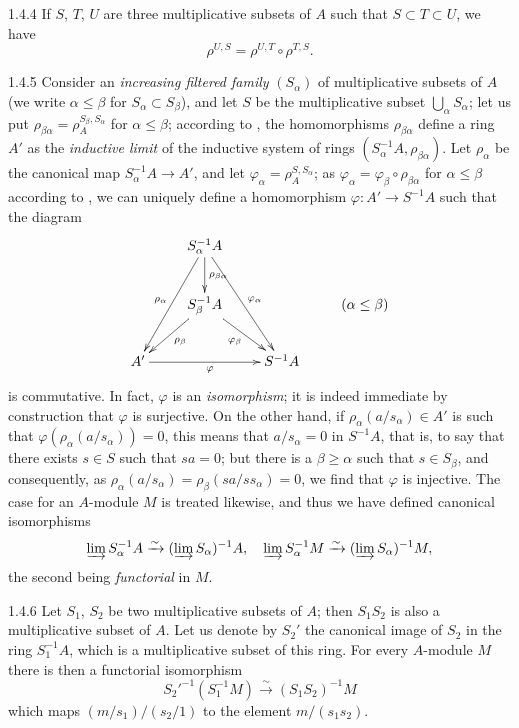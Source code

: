 \documentclass{book}
\begin{document}
\begin{env}{1.4.4}
\label{env-0.1.4.4}
If $S$, $T$, $U$ are three multiplicative subsets of $A$ such that $S\subset T\subset U$, we have
\[
  \rho^{U,S}=\rho^{U,T}\circ\rho^{T,S}.
\]
\end{env}

\begin{env}{1.4.5}
\label{env-0.1.4.5}
Consider an \emph{increasing filtered family} $(S_\alpha)$ of multiplicative subsets of $A$
(we write $\alpha\leq\beta$ for $S_\alpha\subset S_\beta$), and let $S$ be the multiplicative subset
$\bigcup_\alpha S_\alpha$; let us put $\rho_{\beta\alpha}=\rho_A^{S_\beta,S_\alpha}$ for $\alpha\leq\beta$;
according to , the homomorphisms $\rho_{\beta\alpha}$ define a ring $A'$ as the \emph{inductive limit}
of the inductive system of rings $(S_\alpha^{-1}A,\rho_{\beta\alpha})$. Let $\rho_\alpha$ be the canonical
map $S_\alpha^{-1}A\to A'$, and let $\varphi_\alpha=\rho_A^{S,S_\alpha}$; as
$\varphi_\alpha=\varphi_\beta\circ\rho_{\beta\alpha}$ for $\alpha\leq\beta$ according to
, we can uniquely define a homomorphism $\varphi\colon A'\to S^{-1}A$ such that the diagram
\[
  \xymatrix{
    & S_\alpha^{-1}A\ar[ddl]_{\rho_\alpha}\ar[d]^{\rho_{\beta\alpha}}\ar[rdd]^{\varphi_\alpha}\\
    & S_\beta^{-1}A\ar[ld]^{\rho_\beta}\ar[rd]_{\varphi_\beta} & & (\alpha\leq\beta)\\
    A'\ar[rr]_\varphi & & S^{-1}A
  }
\]
is commutative. In fact, $\varphi$ is an \emph{isomorphism}; it is indeed immediate by construction that
$\varphi$ is surjective. On the other hand, if $\rho_\alpha(a/s_\alpha)\in A'$ is such that
${\varphi(\rho_\alpha(a/s_\alpha))=0}$, this means that $a/s_\alpha=0$ in $S^{-1}A$, that is, to say that
there exists $s\in S$ such that $sa=0$; but there is a $\beta\geq\alpha$ such that $s\in S_\beta$, and
consequently, as $\rho_\alpha(a/s_\alpha)=\rho_\beta(sa/ss_\alpha)=0$, we find that $\varphi$ is injective.
The case for an $A$-module $M$ is treated likewise, and thus we have defined canonical isomorphisms
\[
  \varinjlim S_\alpha^{-1}A\xrightarrow{\sim}(\varinjlim S_\alpha)^{-1}A,\quad
  \varinjlim S_\alpha^{-1}M\xrightarrow{\sim}(\varinjlim S_\alpha)^{-1}M,
\]
the second being \emph{functorial} in $M$.
\end{env}

\begin{env}{1.4.6}
\label{env-0.1.4.6}
Let $S_1$, $S_2$ be two multiplicative subsets of $A$; then $S_1 S_2$ is also a multiplicative subset
of $A$. Let us denote by $S_2'$ the canonical image of $S_2$ in the ring $S_1^{-1}A$, which is a multiplicative
subset of this ring. For every $A$-module $M$ there is then a functorial isomorphism
\[
  {S_2'}^{-1}(S_1^{-1}M)\xrightarrow{\sim}(S_1 S_2)^{-1}M
\]
which maps $(m/s_1)/(s_2/1)$ to the element $m/(s_1 s_2)$.
\end{env}
\end{document}
